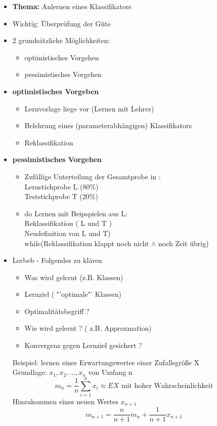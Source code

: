 \documentclass[a4paper,12pt]{scrreprt}
\newcommand{\itemd}[1]{\item{\textbf{#1}} }
\begin{document}
\begin{itemize}
 \itemd{Thema:} Anlernen eines Klassifikators
 \item Wichtig: Überprüfung der Güte
 \item 2 grundsätzliche Möglichkeiten:
 \begin{itemize}
  \item optimistisches Vorgehen
  \item pessimistisches Vorgehen
 \end{itemize}
 \itemd{optimistisches Vorgeben} 
 \begin{itemize}
  \item Lernvorlage liege vor (Lernen mit Lehrer)
  \item Belehrung eines (parameterabhängigen) Klassifikators
  \item Reklassifikation
 \end{itemize}
\itemd{pessimistisches Vorgehen}
\begin{itemize}
 \item Zufällige Unterteilung der Gesamtprobe in :\\
 Lernstichprobe L (80\%)\\
 Teststichprobe T (20\%)\\
 \item do Lernen mit Beipspielen aus L:\\
  Reklassifikation ( L und T )\\
  Neudefinition von L und T)\\
 while(Reklassifikation klappt noch nicht $\land$ noch Zeit übrig)
\end{itemize}

\item Lerbeb - Folgendes zu klären
\begin{itemize}
 \item Was wird gelernt (z.B. Klassen)
 \item Lernziel ( "'optimale"' Klassen)
 \item Optimalitätsbegriff ?
 \item Wie wird gelernt ? ( z.B. Approxmation)
 \item Konvergenz gegen Lernziel gesichert ?
\end{itemize}
Beispiel: lernen eines Erwartungswertes einer Zufallsgröße X\\
Grundlage: $x_1, x_2 , \dots ,x_n$ von Umfang n
$$ m_n = \frac{1}{n} \sum_{i=1}^{n} x_i \approx EX \text{ mit hoher Wahrscheinlichkeit} $$
Hinzukommen eines neuen Wertes $x_{n+1}$
$$ m_{n+1} = \frac{n}{n+1}m_n + \frac{1}{n+1}x_{n+1} $$
\end{itemize}
\end{document}
